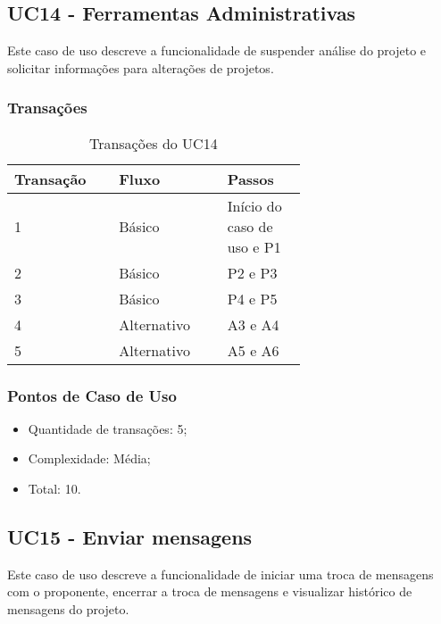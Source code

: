 \pagebreak
\subsection{UC14 - Ferramentas Administrativas}
   
  Este caso de uso descreve a funcionalidade de suspender análise do projeto e solicitar informações para alterações de projetos.
  
  \subsubsection{Transações}

  \begin{table*}[!h]
  \centering
  \caption{Transações do UC14}
  \label{uc14_transactions}
    \begin{tabular}{|p{0.20\linewidth}|p{0.25\linewidth}|p{0.20\linewidth}|}
    \hline
    \textbf{Transação} & \textbf{Fluxo} & \textbf{Passos} \\ 
    \hline
    1 & Básico & Início do caso de uso e P1\\
    \hline
    2 & Básico & P2 e P3\\
    \hline
    3 & Básico & P4 e P5\\
    \hline
    4 & Alternativo & A3 e A4\\
    \hline
    5 & Alternativo & A5 e A6\\
    \hline
    \end{tabular}
  \end{table*}

  \subsubsection{Pontos de Caso de Uso}

  \begin{itemize}
  \item Quantidade de transações: 5;
  \item Complexidade: Média;
  \item Total: 10.
  \end{itemize}

  \vfill

\pagebreak
\subsection{UC15 - Enviar mensagens}
  
  Este caso de uso descreve a funcionalidade de iniciar uma troca de
  mensagens com o proponente, encerrar a troca de mensagens e visualizar histórico de mensagens do projeto. 
  
